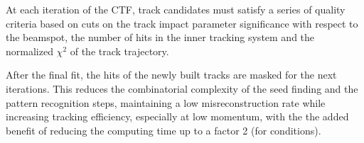 At each iteration of the CTF, track candidates must satisfy a series of quality criteria
based on cuts on the track impact parameter significance with respect to the beamspot,
the number of hits in the inner tracking system and the normalized $\chi^2$ of the track trajectory.

After the final fit, the hits of the newly built tracks are masked for the next iterations.
This reduces the combinatorial complexity of the seed finding and the pattern recognition steps,
maintaining a low misreconstruction rate while increasing tracking efficiency, especially at low momentum,
with the the added benefit of reducing the computing time up to a factor 2 (for \RunII{} conditions).

